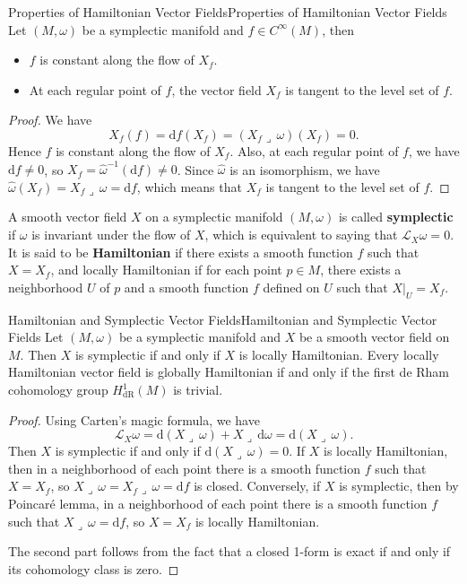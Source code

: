 \documentclass[../main.tex]{subfiles}
\begin{document}
\begin{proposition}{Properties of Hamiltonian Vector Fields}{Properties of Hamiltonian Vector Fields}
  Let $(M, \omega)$ be a symplectic manifold and $f \in C^\infty(M)$, then
  \begin{itemize}
    \item $f$ is constant along the flow of $X_f$.
    \item At each regular point of $f$, the vector field $X_f$ is tangent to the level set of $f$.
  \end{itemize}
\end{proposition}
\begin{proof}
  We have
  \begin{equation*}
    X_f(f) = \mathrm{d} f(X_f) = (X_f \lrcorner \, \omega)(X_f) = 0.
  \end{equation*}
  Hence $f$ is constant along the flow of $X_f$. Also, at each regular point of $f$, we have $\mathrm{d} f \neq 0$, so $X_f = \hat{\omega}^{-1}(\mathrm{d} f) \neq 0$. Since $\hat{\omega}$ is an isomorphism, we have $\hat{\omega}(X_f) = X_f \lrcorner \, \omega = \mathrm{d} f$, which means that $X_f$ is tangent to the level set of $f$.
\end{proof}

A smooth vector field $X$ on a symplectic manifold $(M, \omega)$ is called \textbf{symplectic} if $\omega$ is invariant under the flow of $X$, which is equivalent to saying that $\mathcal{L}_X \omega = 0$. It is said to be \textbf{Hamiltonian} if there exists a smooth function $f$ such that $X = X_f$, and locally Hamiltonian if for each point $p\in M$, there exists a neighborhood $U$ of $p$ and a smooth function $f$ defined on $U$ such that $X|_U = X_f$.

\begin{proposition}{Hamiltonian and Symplectic Vector Fields}{Hamiltonian and Symplectic Vector Fields}
  Let $(M, \omega)$ be a symplectic manifold and $X$ be a smooth vector field on $M$. Then $X$ is symplectic if and only if $X$ is locally Hamiltonian. Every locally Hamiltonian vector field is globally Hamiltonian if and only if the first de Rham cohomology group $H_\mathrm{dR}^1(M)$ is trivial.
\end{proposition}
\begin{proof}
  Using Carten's magic formula, we have
  \begin{equation*}
    \mathcal{L}_X \omega = \mathrm{d} (X \lrcorner \, \omega) + X \lrcorner \, \mathrm{d} \omega = \mathrm{d} (X \lrcorner \, \omega).
  \end{equation*}
  Then $X$ is symplectic if and only if $\mathrm{d} (X \lrcorner \, \omega) = 0$. If $X$ is locally Hamiltonian, then in a neighborhood of each point there is a smooth function $f$ such that $X = X_f$, so $X \lrcorner \, \omega = X_f \lrcorner \, \omega = \mathrm{d} f$ is closed. Conversely, if $X$ is symplectic, then by Poincar\'e lemma, in a neighborhood of each point there is a smooth function $f$ such that $X \lrcorner \, \omega = \mathrm{d} f$, so $X = X_f$ is locally Hamiltonian.

  The second part follows from the fact that a closed 1-form is exact if and only if its cohomology class is zero.
\end{proof}
\end{document}
